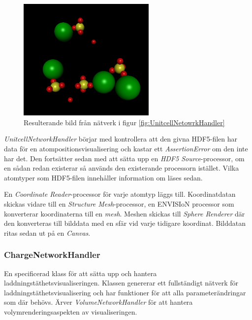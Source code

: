 \documentclass[10pt,oneside,swedish]{article}
\begin{document}
\begin{figure}[H]
\centering
\includegraphics[width=0.60000\textwidth]{Images/unitcell.png}
\caption{Resulterande bild från nätverk i figur
\ref{fig:UnitcellNetowrkHandler}}
\end{figure}

\emph{UnitcellNetworkHandler} börjar med kontrollera att den givna
HDF5-filen har data för en atompositionsvisualisering och kastar ett
\emph{AssertionError} om den inte har det. Den fortsätter sedan med att
sätta upp en \emph{HDF5 Source}-processor, om en sådan redan existerar
så används den existerande processorn istället. Vilka atomtyper som
HDF5-filen innehåller information om läses sedan.

En \emph{Coordinate Reader}-processor för varje atomtyp läggs till.
Koordinatdatan skickas vidare till en \emph{Structure Mesh}-processor,
en ENVISIoN processor som konverterar koordinaterna till en \emph{mesh}.
Meshen skickas till \emph{Sphere Renderer} där den konverteras till
bilddata med en sfär vid varje tidigare koordinat. Bilddatan ritas sedan
ut på en \emph{Canvas}.

\subsubsection{ChargeNetworkHandler}\label{chargenetworkhandler}

En specificerad klass för att sätta upp och hantera
laddningstäthetsvisualiseringen. Klassen genererar ett fullständigt
nätverk för laddningstäthetsvisualisering och har funktioner för att
alla parameterändringar som där behövs. Ärver
\emph{VolumeNetworkHandler} för att hantera volymrenderingsaspekten av
visualiseringen.
\end{document}
